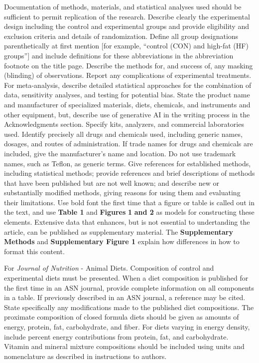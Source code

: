 \documentclass[conference]{IEEEtran}
\begin{document}
Documentation of methods, materials, and statistical analyses used should be sufficient to permit replication of the research. Describe clearly the experimental design including the control and experimental groups and provide eligibility and exclusion criteria and details of randomization. Define all group designations parenthetically at first mention [for example, ``control (CON) and high-fat (HF) groups''] and include definitions for these abbreviations in the abbreviation footnote on the title page. Describe the methods for, and success of, any masking (blinding) of observations. Report any complications of experimental treatments. For meta-analysis, describe detailed statistical approaches for the combination of data, sensitivity analyses, and testing for potential bias. State the product name and manufacturer of specialized materials, diets, chemicals, and instruments and other equipment, but, describe use of generative AI in the writing process in the Acknowledgments section. Specify kits, analyzers, and commercial laboratories used. Identify precisely all drugs and chemicals used, including generic names, dosages, and routes of administration. If trade names for drugs and chemicals are included, give the manufacturer's name and location. Do not use trademark names, such as Teflon, as generic terms. Give references for established methods, including statistical methods; provide references and brief descriptions of methods that have been published but are not well known; and describe new or substantially modified methods, giving reasons for using them and evaluating their limitations. Use bold font the first time that a figure or table is called out in the text, and use \textbf{Table 1} and \textbf{Figure}\textbf{s}\textbf{ 1}\textbf{ and 2} as models for constructing these elements. Extensive data that enhances, but is not essential to undertanding the article, can be published as supplementary material. The \textbf{Supplementary Methods} and \textbf{Supplementary Figure 1} explain how differences in how to format this content.

For \textit{Journal of Nutrition} - Animal Diets. Composition of control and experimental diets must be presented. When a diet composition is published for the first time in an ASN journal, provide complete information on all components in a table. If previously described in an ASN journal, a reference may be cited. State specifically any modifications made to the published diet compositions. The proximate composition of closed formula diets should be given as amounts of energy, protein, fat, carbohydrate, and fiber. For diets varying in energy density, include percent energy contributions from protein, fat, and carbohydrate. Vitamin and mineral mixture compositions should be included using units and nomenclature as described in instructions to authors.
\end{document}
